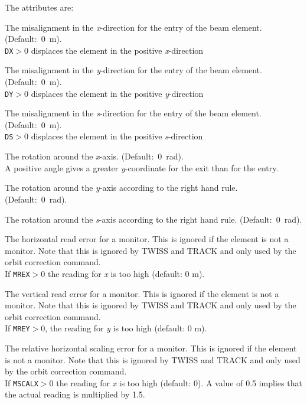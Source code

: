 The attributes are: 
\begin{madlist}
   The misalignment in the \textit{x}-direction for the entry of
  the beam element. (Default:~0~m).  \\ 
  \texttt{DX}$>$0 displaces the element in the positive \textit{x}-direction 
  
   The misalignment in the \textit{y}-direction for the entry of
  the beam element. (Default:~0~m). \\
  \texttt{DY}$>$0 displaces the element in the positive \textit{y}-direction 

   The misalignment in the \textit{s}-direction for the entry of
  the beam element. (Default:~0~m). \\
  \texttt{DS}$>$0 displaces the element in the positive \textit{s}-direction 
  
   The rotation around the \textit{x}-axis. (Default:~0~rad). \\ 
  A positive angle gives a greater \textit{y}-coordinate for the exit
  than for the entry. 

   The rotation around the \textit{y}-axis according to the
  right hand rule. (Default:~0~rad).  

   The rotation around the \textit{s}-axis according to the
  right hand rule. (Default:~0~rad).  

   The horizontal read error for a monitor. This is ignored if
  the element is not a monitor. Note that this is ignored by TWISS and TRACK
  and only used by the orbit correction command.  \\
  If \texttt{MREX}$>$0 the reading for \textit{x} is too high (default: 0 m). 

   The vertical read error for a monitor. This is ignored if
  the element is not a monitor. Note that this is ignored by TWISS and TRACK
  and only used by the orbit correction command.  \\  
  If \texttt{MREY}$>$0, the reading for \textit{y} is too high (default: 0 m). 

   The relative horizontal scaling error for a monitor. This
  is ignored if the element is not a monitor. Note that this is ignored by TWISS and TRACK
  and only used by the orbit correction command.  \\ 
  If \texttt{MSCALX}$>$0 the reading for \textit{x} is too high (default: 0). A
  value of 0.5 implies that the actual reading is multiplied by 1.5.  


\end{madlist}
